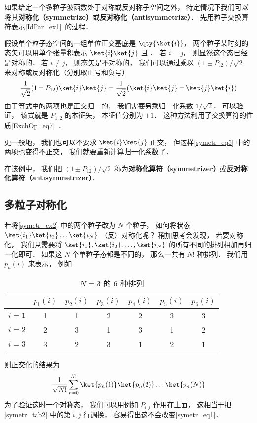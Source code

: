 

如果给定一个多粒子波函数处于对称或反对称子空间之外， 特定情况下我们可以将其\textbf{对称化（symmetrize）}或\textbf{反对称化（antisymmetrize）}． 先用粒子交换算符表示\autoref{IdPar_ex1}~的过程．

\begin{example}{}\label{symetr_ex2}
假设单个粒子态空间的一组单位正交基底是 $\qty{\ket{i}}$， 两个粒子某时刻的态矢可以用单个张量积表示 $\ket{i}\ket{j}$ 且 ． 若 $i = j$， 则显然这个态已经是对称的．  若 $i \ne j$， 则态矢是不对称的， 我们可以通过乘以 $(1 \pm P_{12})/\sqrt{2}$ 来对称或反对称化（分别取正号和负号）
\begin{equation}\label{symetr_eq5}
\frac{1}{\sqrt{2}}(1 \pm P_{12})\ket{i}\ket{j} = \frac{1}{\sqrt{2}}(\ket{i}\ket{j} \pm \ket{j}\ket{i})
\end{equation}
由于等式中的两项也是正交归一的， 我们需要另乘归一化系数 $1/\sqrt 2$． 可以验证， 该式就是 $P_{1,2}$ 的本征矢， 本征值分别为 $\pm 1$． 这种方法利用了交换算符的性质\autoref{ExchOp_eq7}~．

更一般地， 我们也可以不要求 $\ket{i}\ket{j}$ 正交， 但这样\autoref{symetr_eq5} 中的两项也变得不正交， 我们就要重新计算归一化系数了．
\end{example}

在该例中， 我们把 $(1 \pm P_{12})/\sqrt{2}$ 称为\textbf{对称化算符（symmetrizer）}或\textbf{反对称化算符（antisymmetrizer）}．

\subsection{多粒子对称化}
若将\autoref{symetr_ex2} 中的两个粒子改为 $N$ 个粒子， 如何将状态 $\ket{i_1}\ket{i_2}\dots\ket{i_N}$ （反）对称化呢？ 稍加思考会发现， 若要对称化， 我们只需要将 $\ket{i_1},\ket{i_2},\dots,\ket{i_N}$ 的所有不同的排列相加再归一化即可． 如果这 $N$ 个单粒子态都是不同的， 那么一共有 $N!$ 种排列． 我们用 $p_n(i)$ 来表示， 例如
\begin{table}[ht]
\centering
\caption{$N = 3$ 的 6 种排列}\label{symetr_tab2}
\begin{tabular}{|c|c|c|c|c|c|c|}
\hline
  & $p_1(i)$ & $p_2(i)$ & $p_3(i)$ & $p_4(i)$ & $p_5(i)$ & $p_6(i)$ \\
\hline
$i=1$ & 1 & 1 & 2 & 2 & 3 & 3 \\
\hline
$i=2$ & 2 & 3 & 1 & 3 & 1 & 2 \\
\hline
$i=3$ & 3 & 2 & 3 & 1 & 2 & 1 \\
\hline
\end{tabular}
\end{table}
则正交化的结果为
\begin{equation}\label{symetr_eq1}
\frac{1}{\sqrt{N!}}\sum_{n = 0}^{N!} \ket{p_n(1)}\ket{p_n(2)}\dots\ket{p_n(N)}
\end{equation}
为了验证这时一个对称态， 我们可以用例如 $P_{i,j}$ 作用在上面， 这相当于把\autoref{symetr_tab2} 中的第 $i,j$ 行调换， 容易得出这不会改变\autoref{symetr_eq1}．

